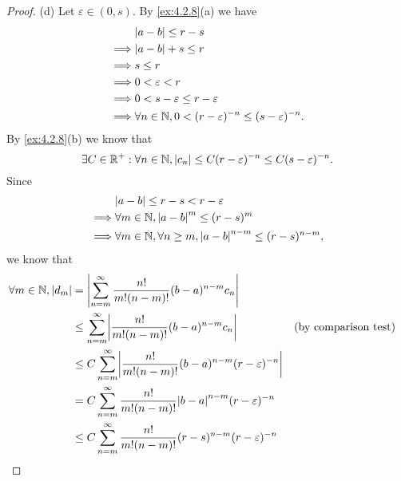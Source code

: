\begin{proof}{(d)}
  Let \(\varepsilon \in (0, s)\).
  By \cref{ex:4.2.8}(a) we have
  \begin{align*}
             & \abs{a - b} \leq r - s                                                    \\
    \implies & \abs{a - b} + s \leq r                                                    \\
    \implies & s \leq r                                                                  \\
    \implies & 0 < \varepsilon < r                                                       \\
    \implies & 0 < s - \varepsilon \leq r - \varepsilon                                  \\
    \implies & \forall n \in \N, 0 < (r - \varepsilon)^{-n} \leq (s - \varepsilon)^{-n}.
  \end{align*}
  By \cref{ex:4.2.8}(b) we know that
  \[
    \exists C \in \mathbb{R}^+ : \forall n \in \mathbb{N}, \left\lvert c_n\right\rvert \leq C (r - \varepsilon)^{-n} \leq C (s - \varepsilon)^{-n}.
  \]
  Since
  \begin{align*}
             & \abs{a - b} \leq r - s < r - \varepsilon                                      \\
    \implies & \forall m \in \N, \abs{a - b}^{m} \leq (r - s)^m                              \\
    \implies & \forall m \in \N, \forall n \geq m, \abs{a - b}^{n - m} \leq (r - s)^{n - m},
  \end{align*}
  we know that
  \begin{align*}
    \forall m \in \N, \abs{d_m} & = \abs{\sum_{n = m}^\infty \dfrac{n!}{m! (n - m)!} (b - a)^{n - m} c_n}                                                          \\
                                & \leq \sum_{n = m}^\infty \abs{\dfrac{n!}{m! (n - m)!} (b - a)^{n - m} c_n}                      &  & \text{(by comparison test)} \\
                                & \leq C \sum_{n = m}^\infty \abs{\dfrac{n!}{m! (n - m)!} (b - a)^{n - m} (r - \varepsilon)^{-n}}                                  \\
                                & = C \sum_{n = m}^\infty \dfrac{n!}{m! (n - m)!} \abs{b - a}^{n - m} (r - \varepsilon)^{-n}                                       \\
                                & \leq C \sum_{n = m}^\infty \dfrac{n!}{m! (n - m)!} (r - s)^{n - m} (r - \varepsilon)^{-n}                                        \\

\end{align*}
\end{proof}
